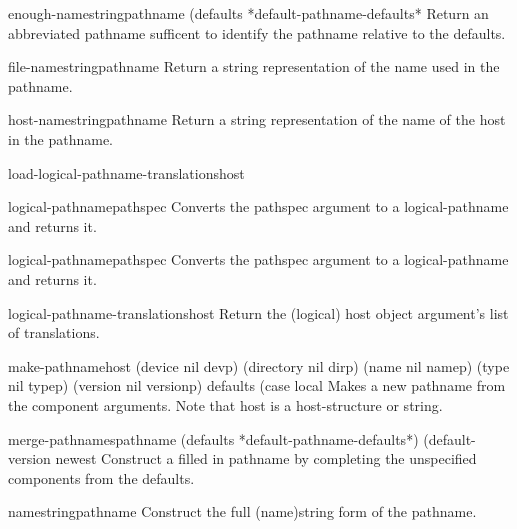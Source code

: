 \begin{function}{enough-namestring}{pathname \op (defaults *default-pathname-defaults*}{}
  Return an abbreviated pathname sufficent to identify the pathname relative
   to the defaults.
\end{function}

\begin{function}{file-namestring}{pathname}{}
  Return a string representation of the name used in the pathname.
\end{function}

\begin{function}{host-namestring}{pathname}{}
  Return a string representation of the name of the host in the pathname.
\end{function}

\begin{function}{load-logical-pathname-translations}{host}{}
  
\end{function}

\begin{function}{logical-pathname}{pathspec}{}
  Converts the pathspec argument to a logical-pathname and returns it.
\end{function}

\begin{class}{logical-pathname}{pathspec}{}
  Converts the pathspec argument to a logical-pathname and returns it.
\end{class}

\begin{accessor}{logical-pathname-translations}{host}{}
  Return the (logical) host object argument's list of translations.
\end{accessor}

\begin{function}{make-pathname}{\key host (device nil devp) (directory nil dirp) (name nil namep)
 (type nil typep) (version nil versionp) defaults (case local}{}
  Makes a new pathname from the component arguments. Note that host is
a host-structure or string.
\end{function}

\begin{function}{merge-pathnames}{pathname \op (defaults *default-pathname-defaults*)
          (default-version newest}{}
  Construct a filled in pathname by completing the unspecified components
   from the defaults.
\end{function}

\begin{function}{namestring}{pathname}{}
  Construct the full (name)string form of the pathname.
\end{function}

